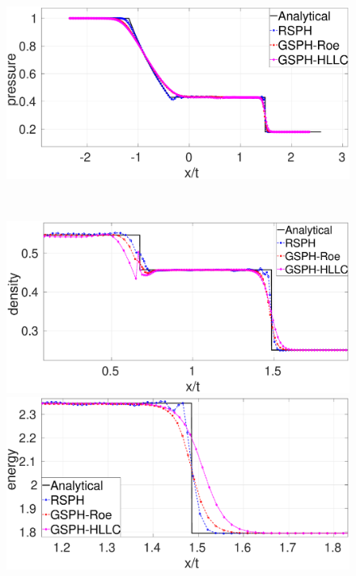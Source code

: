 \begin{figure}
\begin{minipage}{.495\textwidth}
    \end{minipage}%
    \begin{minipage}{.495 \textwidth}
        \centering
        \includegraphics[width=0.99 \textwidth]{Chapter-4/Figures/Sod/RCM-Sod-GSPH-compare-p}
    \end{minipage}%
    \\
    \begin{minipage}{.495\textwidth}
        \centering
        \includegraphics[width=0.99 \textwidth]{Chapter-4/Figures/Sod/RCM-Sod-GSPH-compare-rho-zoom}
    \end{minipage}%
    \begin{minipage}{.495 \textwidth}
        \centering
        \includegraphics[width=0.99 \textwidth]{Chapter-4/Figures/Sod/RCM-Sod-GSPH-compare-e-zoom}

\end{minipage}
\end{figure}
